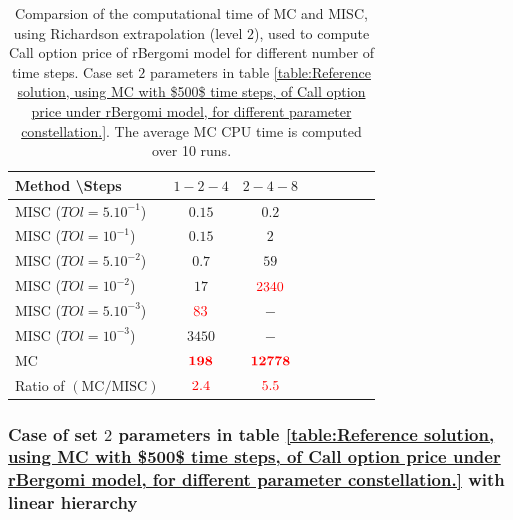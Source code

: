 \documentclass[11pt]{article}
\begin{document}
\begin{table}[!h]
	\centering
	\begin{tabular}{l*{6}{c}r}
		Method \textbackslash  Steps            & $1-2-4$ & $2-4-8$   \\
		\hline
		MISC ($TOl=5.10^{-1}$)  & $0.15$ & $0.2$  \\
		MISC ($TOl=10^{-1}$)  & $0.15$ & $2$ &   \\
		MISC ($TOl=5.10^{-2}$)  & $0.7$ & $59$  \\
		MISC ($TOl=10^{-2}$)  & $17$ & ${\color{red}2340}$   \\
		MISC ($TOl=5.10^{-3}$)  & ${\color{red}83}$ & $-$  \\	
		MISC ($TOl=10^{-3}$)  & $3450$ & $-$  \\	

		\hline
		MC    & $\mathbf{ {\color{red} 198}}$  & $\mathbf{ {\color{red}12778}}$  \\
		
		\hline
		Ratio of $\left(\text{MC}/ \text{MISC} \right)$  &${\color{red}2.4}$ & ${\color{red} 5.5}$   \\
		\hline
	\end{tabular}
	\caption{Comparsion of the computational time of  MC and MISC, using Richardson extrapolation (level $2$), used to compute Call option price of rBergomi model for different number of time steps. Case set $2$ parameters in table \ref{table:Reference solution, using MC with $500$ time steps, of Call option price under rBergomi model, for different parameter constellation.}. The
		average MC CPU time is computed over 10 runs.}
	\label{Comparsion of the computational time of  MC and MISC, using Richardson extrapolation (level $2$), used to compute Call option price of rBergomi model for different number of time steps. Case set $2$ parameters}
\end{table}


\FloatBarrier



\subsubsection{Case of set $2$ parameters in table \ref{table:Reference solution, using MC with $500$ time steps, of Call option price under rBergomi model, for different parameter constellation.} with linear hierarchy}
\label{sec:Case of set $2$ parameters_linear}
\end{document}
